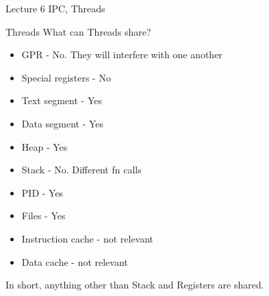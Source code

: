 \documentclass[presentation]{beamer}
\begin{document}
\begin{frame}[label={sec:orgb061a4c},fragile]{Lecture 6 IPC, Threads}
\begin{block}{Threads}
What can Threads share?
\begin{itemize}
\item GPR - No. They will interfere with one another
\item Special registers - No
\item Text segment - Yes
\item Data segment - Yes
\item Heap - Yes
\item Stack - No. Different fn calls
\item PID - Yes
\item Files - Yes
\item Instruction cache - not relevant
\item Data cache - not relevant
\end{itemize}

In short, anything other than \alert{Stack and Registers} are shared.
\end{block}
\end{frame}
\end{document}

